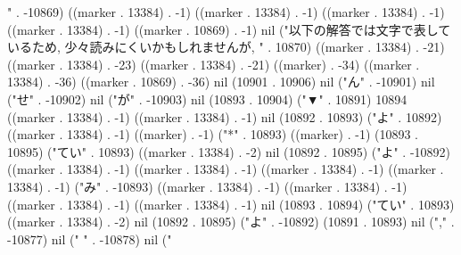 " . -10869) ((marker . 13384) . -1) ((marker . 13384) . -1) ((marker . 13384) . -1) ((marker . 13384) . -1) ((marker . 10869) . -1) nil ("以下の解答では文字で表しているため, 少々読みにくいかもしれませんが, " . 10870) ((marker . 13384) . -21) ((marker . 13384) . -23) ((marker . 13384) . -21) ((marker) . -34) ((marker . 13384) . -36) ((marker . 10869) . -36) nil (10901 . 10906) nil ("ん" . -10901) nil ("せ" . -10902) nil ("が" . -10903) nil (10893 . 10904) ("▼" . 10891) 10894 ((marker . 13384) . -1) ((marker . 13384) . -1) nil (10892 . 10893) ("よ" . 10892) ((marker . 13384) . -1) ((marker) . -1) ("*" . 10893) ((marker) . -1) (10893 . 10895) ("てい" . 10893) ((marker . 13384) . -2) nil (10892 . 10895) ("よ" . -10892) ((marker . 13384) . -1) ((marker . 13384) . -1) ((marker . 13384) . -1) ((marker . 13384) . -1) ("み" . -10893) ((marker . 13384) . -1) ((marker . 13384) . -1) ((marker . 13384) . -1) ((marker . 13384) . -1) nil (10893 . 10894) ("てい" . 10893) ((marker . 13384) . -2) nil (10892 . 10895) ("よ" . -10892) (10891 . 10893) nil ("," . -10877) nil (" " . -10878) nil ("
